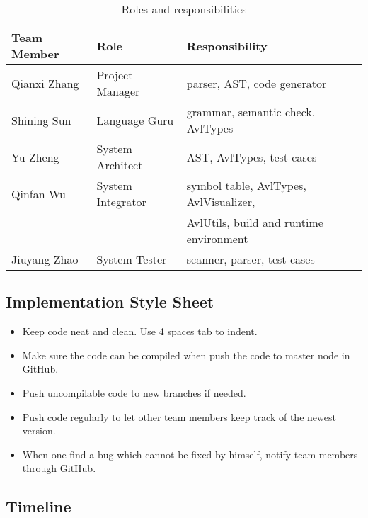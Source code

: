 \begin{table}[htp]
  \centering
  \begin{tabular}{|l|l|l|}
    \hline
    Team Member & Role & Responsibility \\
    \hline
    Qianxi Zhang & Project Manager & parser, AST, code generator \\
    \hline
    Shining Sun & Language Guru & grammar, semantic check, AvlTypes \\
    \hline
    Yu Zheng & System Architect & AST, AvlTypes, test cases \\
    \hline
    Qinfan Wu & System Integrator & symbol table, AvlTypes, AvlVisualizer, \\
    & & AvlUtils, build and runtime environment \\
    \hline
    Jiuyang Zhao & System Tester & scanner, parser, test cases \\
    \hline
  \end{tabular}
  \caption{Roles and responsibilities}
  \label{tab:roles}
\end{table}

\subsection{Implementation Style Sheet}

\begin{itemize}
\item
Keep code neat and clean. Use 4 spaces tab to indent.
\item
Make sure the code can be compiled when push the code to master node in GitHub.
\item
Push uncompilable code to new branches if needed.
\item
Push code regularly to let other team members keep track of the newest version.
\item
When one find a bug which cannot be fixed by himself, notify team members through GitHub.
\end{itemize}

\subsection{Timeline}

